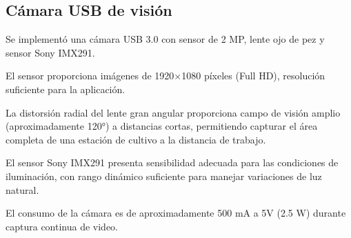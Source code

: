 \subsection{Cámara USB de visión}

Se implementó una cámara USB 3.0 con sensor de 2 MP, lente ojo de pez y sensor Sony IMX291.

El sensor proporciona imágenes de 1920×1080 píxeles (Full HD), resolución suficiente para la aplicación.

La distorsión radial del lente gran angular proporciona campo de visión amplio (aproximadamente 120°) a distancias cortas, permitiendo capturar el área completa de una estación de cultivo a la distancia de trabajo.

El sensor Sony IMX291 presenta sensibilidad adecuada para las condiciones de iluminación, con rango dinámico suficiente para manejar variaciones de luz natural.

El consumo de la cámara es de aproximadamente 500 mA a 5V (2.5 W) durante captura continua de video.
